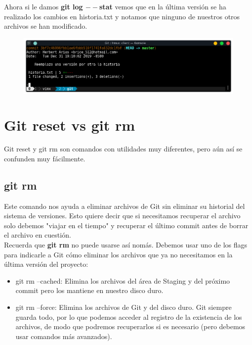 \documentclass{article}
\begin{document}
Ahora si le damos \textbf{git log $--$stat} vemos que en la última versión se
ha realizado los cambios en historia.txt y notamos que ninguno de nuestros
otros archivos se han modificado.

\begin{figure}[h!]
  \centering
  \includegraphics[scale=0.75]{./Pictures/128_log_stat.png}
\end{figure}

\newpage


\section{Git reset vs git rm}%

Git reset y git rm son comandos con utilidades muy diferentes, pero aún así se
confunden muy fácilmente.\\

\subsection*{git rm}%
Este comando nos ayuda a eliminar archivos de Git sin eliminar su historial del
sistema de versiones. Esto quiere decir que si necesitamos recuperar el archivo
solo debemos "viajar en el tiempo" y recuperar el último commit antes de borrar
el archivo en cuestión.\\

Recuerda que \textbf{git rm} no puede usarse así nomás. Debemos usar uno de los
flags para indicarle a Git cómo eliminar los archivos que ya no necesitamos en
la última versión del proyecto:

\begin{itemize}
  \item git rm --cached: Elimina los archivos del área de Staging y del próximo
    commit pero los mantiene en nuestro disco duro.
  \item git rm --force: Elimina los archivos de Git y del disco duro. Git
    siempre guarda todo, por lo que podemos acceder al registro de la
    existencia de los archivos, de modo que podremos recuperarlos si es
    necesario (pero debemos usar comandos más avanzados).
\end{itemize}
\end{document}
